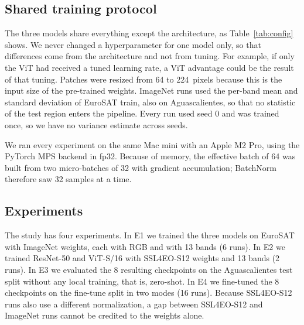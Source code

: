\subsection{Shared training protocol}

The three models share everything except the architecture, as Table~\ref{tab:config} shows. We
never changed a hyperparameter for one model only, so that differences come from the
architecture and not from tuning. For example, if only the ViT had received a tuned learning
rate, a ViT advantage could be the result of that tuning. Patches were resized from 64 to
224~pixels because this is the input size of the pre-trained weights. ImageNet runs used the
per-band mean and standard deviation of EuroSAT train, also on Aguascalientes, so that no
statistic of the test region enters the pipeline. Every run used seed 0 and was trained once,
so we have no variance estimate across seeds.



We ran every experiment on the same Mac mini with an Apple M2 Pro, using the PyTorch MPS
backend in fp32. Because of memory, the effective batch of 64 was built from two micro-batches
of 32 with gradient accumulation; BatchNorm therefore saw 32 samples at a time.

\subsection{Experiments}

The study has four experiments. In E1 we trained the three models on EuroSAT with ImageNet
weights, each with RGB and with 13 bands (6 runs). In E2 we trained ResNet-50 and ViT-S/16 with
SSL4EO-S12 weights and 13 bands (2 runs). In E3 we evaluated the 8 resulting checkpoints on the
Aguascalientes test split without any local training, that is, zero-shot. In E4 we fine-tuned
the 8 checkpoints on the fine-tune split in two modes (16 runs). Because SSL4EO-S12 runs also
use a different normalization, a gap between SSL4EO-S12 and ImageNet runs cannot be credited to
the weights alone.

